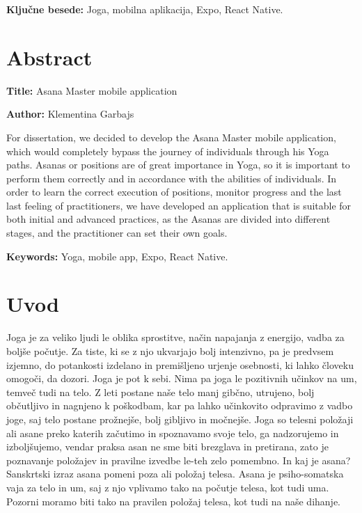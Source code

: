 \documentclass[a4paper, 12pt]{book}
\newcommand{\ttitleEn}{Asana Master mobile application}
\newcommand{\tauthor}{Klementina Garbajs}
\newcommand{\tkeywords}{Joga, mobilna aplikacija, Expo, React Native}
\newcommand{\tkeywordsEn}{Yoga, mobile app, Expo, React Native}
\newcommand{\clearemptydoublepage}{\newpage{\pagestyle{empty}\cleardoublepage}}
\begin{document}
\bigskip

\noindent\textbf{Ključne besede:} \tkeywords.
\clearemptydoublepage

\chapter*{Abstract}

\noindent\textbf{Title:} \ttitleEn
\bigskip

\noindent\textbf{Author:} \tauthor
\bigskip

\noindent 

For dissertation, we decided to develop the Asana Master mobile application, which would completely bypass the journey of individuals through his Yoga paths. Asanas or  positions are of great importance in Yoga, so it is important to perform them correctly and in accordance with the abilities of individuals. In order to learn the correct execution of positions, monitor progress and the last last feeling of practitioners, we have developed an application that is suitable for both initial and advanced practices, as the Asanas are divided into different stages, and the practitioner can set their own goals.
\bigskip

\noindent\textbf{Keywords:} \tkeywordsEn.
\clearemptydoublepage

\mainmatter
\setcounter{page}{1}
\pagestyle{fancy}

\chapter{Uvod}
Joga je za veliko ljudi le oblika sprostitve, način napajanja z energijo, vadba za boljše počutje. Za tiste, ki se z njo ukvarjajo bolj intenzivno, pa je predvsem izjemno, do potankosti izdelano in premišljeno urjenje osebnosti, ki lahko človeku omogoči, da dozori. Joga je pot k sebi. Nima pa joga le pozitivnih učinkov na um, temveč tudi na telo. 
Z leti postane naše telo manj gibčno, utrujeno, bolj občutljivo in nagnjeno k poškodbam, kar pa lahko učinkovito odpravimo z vadbo joge, saj telo postane prožnejše, bolj gibljivo in močnejše. Joga so telesni položaji ali asane preko katerih začutimo in spoznavamo svoje telo, ga nadzorujemo in izboljšujemo, vendar praksa asan ne sme biti brezglava in pretirana, zato je poznavanje položajev in pravilne izvedbe le-teh zelo pomembno. 
In kaj je asana? Sanskrtski izraz asana pomeni poza ali položaj telesa. Asana je psiho-somatska vaja za telo in um, saj z njo vplivamo tako na počutje telesa, kot tudi uma. Pozorni moramo biti tako na pravilen položaj telesa, kot tudi na naše dihanje. 
\end{document}
